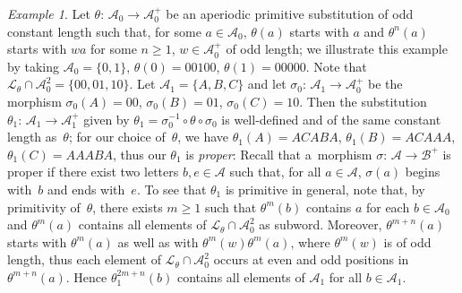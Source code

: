 \documentclass{amsart}
\theoremstyle{definition}
\theoremstyle{remark}
\newtheorem{example}[lemma]{Example}
\numberwithin{equation}{section}
\begin{document}
\begin{example} \label{ex:ws}
Let $\theta:\, \mathcal{A}_0 \to \mathcal{A}_0^+$ be an aperiodic primitive substitution of odd constant length such that, for some $a \in \mathcal{A}_0$, $\theta(a)$ starts with $a$ and $\theta^n(a)$ starts with $wa$ for some $n \ge 1$, $w \in \mathcal{A}_0^+$ of odd length; we illustrate this example by taking $\mathcal{A}_0=\{0,1\}$, $\theta(0) = 00100$, $\theta(1)= 00000$.  Note that 
 $ \mathcal{L}_\theta \cap \mathcal{A}_0^2 =\{ 00, 01, 10 \}$. Let  $\mathcal{A}_1 = \{A,B,C\}$ and let  
 $\sigma_0:\, \mathcal{A}_1 \to \mathcal{A}_0^+$ be the  morphism  $\sigma_0(A) = 00$, $\sigma_0(B) = 01$, $\sigma_0(C)= 10$. 
Then the substitution $\theta_1:\, \mathcal{A}_1 \to \mathcal{A}_1^+$ given by $\theta_1 = \sigma_0^{-1} \circ \theta \circ \sigma_0$ is well-defined and of the same constant length as~$\theta$; for our choice of~$\theta$, we have $\theta_1(A) = ACABA$, $\theta_1(B) = ACAAA$, $\theta_1(C) = AAABA$, thus our $\theta_1$ is {\em proper}:
Recall that a~morphism $\sigma:\, \mathcal{A} \to \mathcal{B}^+$ is proper if there exist two letters $b,e \in \mathcal{A}$ such that, for all $a \in \mathcal{A}$, $\sigma(a)$ begins with~$b$ and ends with~$e$. 
To see that $\theta_1$ is primitive in general, note that, by primitivity of~$\theta$, there exists $m \ge 1$ such that $\theta^m(b)$ contains $a$ for each $b \in \mathcal{A}_0$ and $\theta^m(a)$ contains all elements of $\mathcal{L}_\theta \cap \mathcal{A}_0^2$ as subword.
Moreover, $\theta^{m+n}(a)$ starts with $\theta^m(a)$ as well as with $\theta^m(w) \theta^m(a)$, where $\theta^m(w)$ is of odd length, thus each element of $\mathcal{L}_\theta \cap \mathcal{A}_0^2$ occurs at even and odd positions in~$\theta^{m+n}(a)$.
Hence $\theta_1^{2m+n}(b)$ contains all elements of $\mathcal{A}_1$ for all $b \in \mathcal{A}_1$. 


\end{example}
\end{document}
